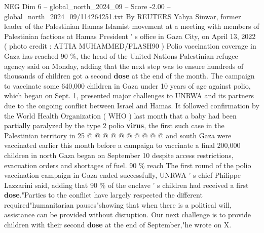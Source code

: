 \begin{textsample}{NEG Dim 6 – global\_north\_2024\_09 – Score -2.00 – global\_north\_2024\_09/114264251.txt}
By REUTERS Yahya Sinwar, former leader of the Palestinian Hamas Islamist movement at a meeting with members of Palestinian factions at Hamas President ' s office in Gaza City, on April 13, 2022 ( photo credit : ATTIA MUHAMMED/FLASH90 ) Polio vaccination coverage in Gaza has reached 90 \%, the head of the United Nations Palestinian refugee agency said on Monday, adding that the next step was to ensure hundreds of thousands of children got a second \textbf{dose} at the end of the month.
The campaign to vaccinate some 640,000 children in Gaza under 10 years of age against polio, which began on Sept. 1, presented major challenges to UNRWA and its partners due to the ongoing conflict between Israel and Hamas.
It followed confirmation by the World Health Organization ( WHO ) last month that a baby had been partially paralyzed by the type 2 polio \textbf{virus}, the first such case in the Palestinian territory in 25 @ @ @ @ @ @ @ @ @ @ and south Gaza were vaccinated earlier this month before a campaign to vaccinate a final 200,000 children in north Gaza began on September 10 despite access restrictions, evacuation orders and shortages of fuel. 90 \% reach The first round of the polio vaccination campaign in Gaza ended successfully, UNRWA ' s chief Philippe Lazzarini said, adding that 90 \% of the enclave ' s children had received a first \textbf{dose}."Parties to the conflict have largely respected the different required"humanitarian pauses"showing that when there is a political will, assistance can be provided without disruption.
Our next challenge is to provide children with their second \textbf{dose} at the end of September,"he wrote on X.

\end{textsample}
